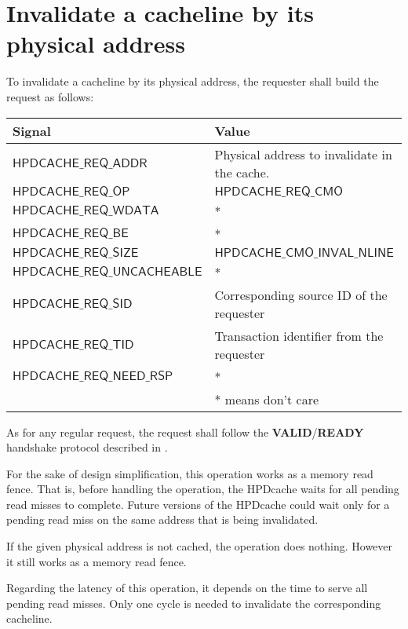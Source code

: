 \documentclass[10pt,titlepage,twoside]{book}
\begin{document}
\newpage
\section{Invalidate a cacheline by its physical address}

To invalidate a cacheline by its physical address, the requester shall build the request as follows:

{\centering\footnotesize\begin{tabular}{p{.38\linewidth}p{.55\linewidth}}
  \toprule
  \textbf{Signal}
  & \textbf{Value} \\
  \midrule
  $\mathsf{HPDCACHE\_REQ\_ADDR}$
  & Physical address to invalidate in the cache.\\
  \midrule
  $\mathsf{HPDCACHE\_REQ\_OP}$
  & $\mathsf{HPDCACHE\_REQ\_CMO}$ \\
  \midrule
  $\mathsf{HPDCACHE\_REQ\_WDATA}$
  & *\\
  \midrule
  $\mathsf{HPDCACHE\_REQ\_BE}$
  & *\\
  \midrule
  $\mathsf{HPDCACHE\_REQ\_SIZE}$
  & $\mathsf{HPDCACHE\_CMO\_INVAL\_NLINE}$ \\
  \midrule
  $\mathsf{HPDCACHE\_REQ\_UNCACHEABLE}$
  & *\\
  \midrule
  $\mathsf{HPDCACHE\_REQ\_SID}$
  & Corresponding source ID of the requester\\
  \midrule
  $\mathsf{HPDCACHE\_REQ\_TID}$
  & Transaction identifier from the requester\\
  \midrule
  $\mathsf{HPDCACHE\_REQ\_NEED\_RSP}$
  & *\\
  \bottomrule
  & * means don't care \\
\end{tabular}}

As for any regular request, the request shall follow the \textbf{VALID}/\textbf{READY} handshake protocol described in .

For the sake of design simplification, this operation works as a memory read fence.
That is, before handling the operation, the \ac{HPDcache} waits for all pending read misses to complete.
Future versions of the HPDcache could wait only for a pending read miss on the same address that is being invalidated.

If the given physical address is not cached, the operation does nothing.
However it still works as a memory read fence.

Regarding the latency of this operation, it depends on the time to serve all pending read misses.
Only one cycle is needed to invalidate the corresponding cacheline.
\end{document}
